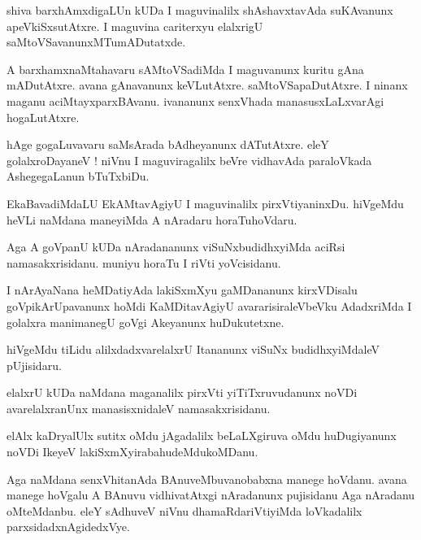 \documentclass{article}
\begin{document}
\begin{mn}%
shiva barxhAmxdigaLUn kUDa I maguvinalilx shAshavxtavAda suKAvanunx apeVkiSxsutAtxre. I 
maguvina cariterxyu elalxrigU saMtoVSavanunxMTumADutatxde.
\end{mn}

\begin{mn}%
A barxhamxnaMtahavaru sAMtoVSadiMda I maguvanunx kuritu gAna mADutAtxre. avana gAnavanunx 
keVLutAtxre. saMtoVSapaDutAtxre. I ninanx maganu aciMtayxparxBAvanu. ivananunx senxVhada 
manasusxLaLxvarAgi hogaLutAtxre.
\end{mn}

\begin{mn}%
hAge gogaLuvavaru saMsArada bAdheyanunx dATutAtxre. eleY golalxroDayaneV ! niVnu I 
maguviragalilx beVre vidhavAda paraloVkada AshegegaLanun bTuTxbiDu.
\end{mn}

\begin{mn}%
EkaBavadiMdaLU EkAMtavAgiyU I maguvinalilx pirxVtiyaninxDu. hiVgeMdu heVLi naMdana 
maneyiMda A nAradaru horaTuhoVdaru.
\end{mn}

\begin{mn}%
Aga A goVpanU kUDa nAradananunx viSuNxbudidhxyiMda aciRsi namasakxrisidanu. muniyu horaTu I 
riVti yoVcisidanu.
\end{mn}

\begin{mn}%
I nArAyaNana heMDatiyAda lakiSxmXyu gaMDananunx kirxVDisalu goVpikArUpavanunx hoMdi 
KaMDitavAgiyU avararisiraleVbeVku AdadxriMda I golalxra manimanegU goVgi Akeyanunx 
huDukutetxne.
\end{mn}

\begin{mn}%
hiVgeMdu tiLidu alilxdadxvarelalxrU Itananunx viSuNx budidhxyiMdaleV pUjisidaru.
\end{mn}

\begin{mn}%
elalxrU kUDa naMdana maganalilx pirxVti yiTiTxruvudanunx noVDi avarelalxranUnx  
manasisxnidaleV namasakxrisidanu.
\end{mn}

\begin{mn}%
elAlx kaDryalUlx sutitx oMdu jAgadalilx beLaLXgiruva oMdu huDugiyanunx noVDi IkeyeV 
lakiSxmXyirabahudeMdukoMDanu.
\end{mn}

\begin{mn}%
Aga naMdana senxVhitanAda BAnuveMbuvanobabxna manege hoVdanu. avana manege hoVgalu A 
BAnuvu vidhivatAtxgi nAradanunx pujisidanu Aga nAradanu oMteMdanbu. eleY sAdhuveV niVnu 
dhamaRdariVtiyiMda loVkadalilx parxsidadxnAgidedxVye.
\end{mn}
\end{document}
